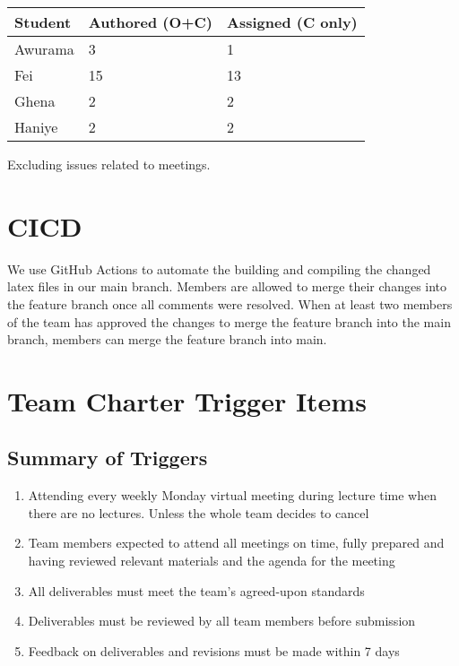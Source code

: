 \documentclass{article}
\begin{document}
\begin{table}[H]
\centering
\begin{tabular}{lll}
\toprule
\textbf{Student} & \textbf{Authored (O+C)} & \textbf{Assigned (C only)}\\
\midrule
Awurama & 3 & 1 \\
Fei & 15 & 13 \\
Ghena & 2 & 2 \\
Haniye & 2 & 2 \\
\bottomrule
\end{tabular}
\end{table}

Excluding issues related to meetings.
\section{CICD}
We use GitHub Actions to automate the building and compiling the changed latex files in our main branch.
Members are allowed to merge their changes into the feature branch once all comments were resolved.
When at least two members of the team has approved the changes to merge the feature branch into the main branch, members can merge the feature branch into main. \\


\section{Team Charter Trigger Items}

\subsection{Summary of Triggers}
\begin{enumerate}
\item{Attending every weekly Monday virtual meeting during lecture time when there are no lectures. Unless the whole team decides to cancel}
\item{Team members expected to attend all meetings on time, fully prepared and having reviewed relevant materials and the agenda for the meeting}
\item{All deliverables must meet the team's agreed-upon standards}
\item{Deliverables must be reviewed by all team members before submission}
\item{Feedback on deliverables and revisions must be made within 7 days}
\end{enumerate}
\end{document}
